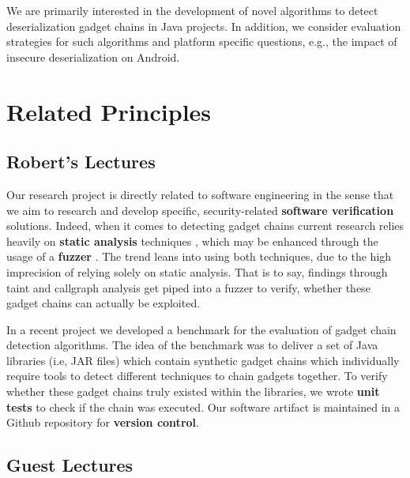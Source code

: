\documentclass[11pt]{article}
\begin{document}
\vspace{0.5cm}

\noindent We are primarily interested in the development of novel algorithms to detect deserialization gadget chains in Java projects. In addition, we consider evaluation strategies for such algorithms and platform specific questions, e.g., the impact of insecure deserialization on Android.


\section*{Related Principles}

\subsection{Robert's Lectures}
\label{sec:lecture}

Our research project is directly related to software engineering in the sense that we aim to research and develop specific, security-related \textbf{software verification} solutions. Indeed, when it comes to detecting gadget chains current research relies heavily on \textbf{static analysis} techniques \cite{haken_automated_2018, buccioli_jchainz_2023, chen_tabby_2023, wu_static_2022, luo_rev_2024, cao_improving_2023}, which may be enhanced through the usage of a \textbf{fuzzer} \cite{rasheed_hybrid_2021, cao_oddfuzz_2023, srivastava_crystallizer_2023, chen_efficient_2024}. The trend leans into using both techniques, due to the high imprecision of relying solely on static analysis. That is to say, findings through taint and callgraph analysis get piped into a fuzzer to verify, whether these gadget chains can actually be exploited.

In a recent project we developed a benchmark for the evaluation of gadget chain detection algorithms. The idea of the benchmark was to deliver a set of Java libraries (i.e, JAR files) which contain synthetic gadget chains which individually require tools to detect different techniques to chain gadgets together. To verify whether these gadget chains truly existed within the libraries, we wrote \textbf{unit tests} to check if the chain was executed. Our software artifact is maintained in a Github repository for \textbf{version control}.

\subsection{Guest Lectures}
\end{document}
